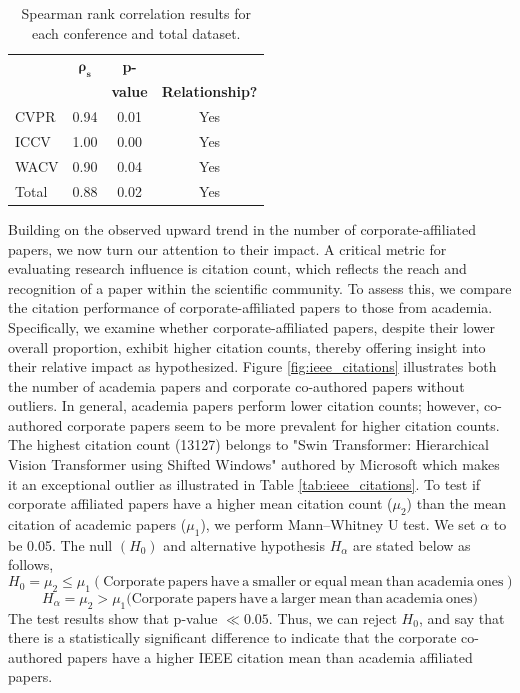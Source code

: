 \documentclass{article}
\begin{document}
\begin{table}[ht]
\centering
\begin{tabular}{|l|c|c|c|}
\hline
\textbf{} & \( \bm{\rho}_\bm{s} \) & \textbf{p-} & {\textbf{Significant}\\ \textbf{}&\textbf{}&\textbf{value}&\textbf{Relationship?}} \\ \hline
CVPR & 0.94 & 0.01 & Yes \\ \hline
ICCV & 1.00 & 0.00 & Yes \\ \hline
WACV & 0.90 & 0.04 & Yes \\ \hline
Total & 0.88 & 0.02 & Yes \\ \hline
\end{tabular}
\caption{Spearman rank correlation results for each conference and total dataset.}
\label{tab:spearman_results}
\end{table}

Building on the observed upward trend in the number of corporate-affiliated papers, we now turn our attention to their impact. A critical metric for evaluating research influence is citation count, which reflects the reach and recognition of a paper within the scientific community. To assess this, we compare the citation performance of corporate-affiliated papers to those from academia. Specifically, we examine whether corporate-affiliated papers, despite their lower overall proportion, exhibit higher citation counts, thereby offering insight into their relative impact as hypothesized. Figure \ref{fig:ieee_citations} illustrates both the number of academia papers and corporate co-authored papers without outliers. In general, academia papers perform lower citation counts; however, co-authored corporate papers seem to be more prevalent for higher citation counts. The highest citation count (13127) belongs to "Swin Transformer: Hierarchical Vision Transformer using Shifted Windows" authored by Microsoft which makes it an exceptional outlier as illustrated in Table \ref{tab:ieee_citations}. To test if corporate affiliated papers have a higher mean citation count ($\mu_2$) than the mean citation of academic papers ($\mu_1$), we perform Mann–Whitney U test. We set $\alpha$ to be 0.05. The null $(H_0)$ and alternative hypothesis $H_\alpha$ are stated below as follows,
\[
H_0 = \mu_2 \leq \mu_1 (\mathrm{Corporate \ papers\ have \ a \ smaller \ or \ equal \ mean \ than \ academia \ ones})
\]
\[
H_\alpha = \mu_2 > \mu_1 (\mathrm{Corporate \ papers\ have \ a \ larger \ mean\ than \ academia \ ones)}
\]
The test results show that p-value $\ll 0.05$. Thus, we can reject $H_0$, and say that there is a statistically significant difference to indicate that the corporate co-authored papers have a higher IEEE citation mean than academia affiliated papers.   
\end{document}
